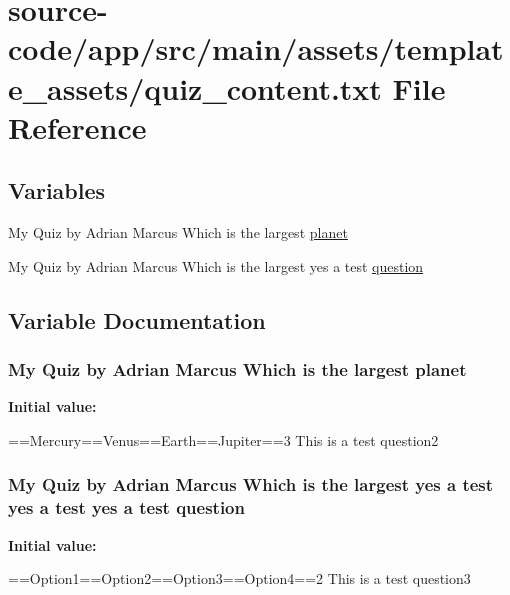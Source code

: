 \hypertarget{quiz__content_8txt}{}\section{source-\/code/app/src/main/assets/template\+\_\+assets/quiz\+\_\+content.txt File Reference}
\label{quiz__content_8txt}
\subsection*{Variables}
\begin{DoxyCompactItemize}
\item 
My Quiz by Adrian Marcus Which is the largest \hyperlink{quiz__content_8txt_a835100bcee31d5a215b7bc2d1dac2c69}{planet}
\item 
My Quiz by Adrian Marcus Which is the largest yes a test \hyperlink{quiz__content_8txt_a4a899bd252c466e4cb51d25efbeae317}{question}
\end{DoxyCompactItemize}


\subsection{Variable Documentation}
\subsubsection[{\texorpdfstring{planet}{planet}}]{\setlength{\rightskip}{0pt plus 5cm}My Quiz by Adrian Marcus Which is the largest planet}\hypertarget{quiz__content_8txt_a835100bcee31d5a215b7bc2d1dac2c69}{}\label{quiz__content_8txt_a835100bcee31d5a215b7bc2d1dac2c69}
{\bfseries Initial value\+:}
\begin{DoxyCode}
==Mercury==Venus==Earth==Jupiter==3
This is a test question2
\end{DoxyCode}
\subsubsection[{\texorpdfstring{question}{question}}]{\setlength{\rightskip}{0pt plus 5cm}My Quiz by Adrian Marcus Which is the largest yes a test yes a test yes a test question}\hypertarget{quiz__content_8txt_a4a899bd252c466e4cb51d25efbeae317}{}\label{quiz__content_8txt_a4a899bd252c466e4cb51d25efbeae317}
{\bfseries Initial value\+:}
\begin{DoxyCode}
==Option1==Option2==Option3==Option4==2
This is a test question3
\end{DoxyCode}
